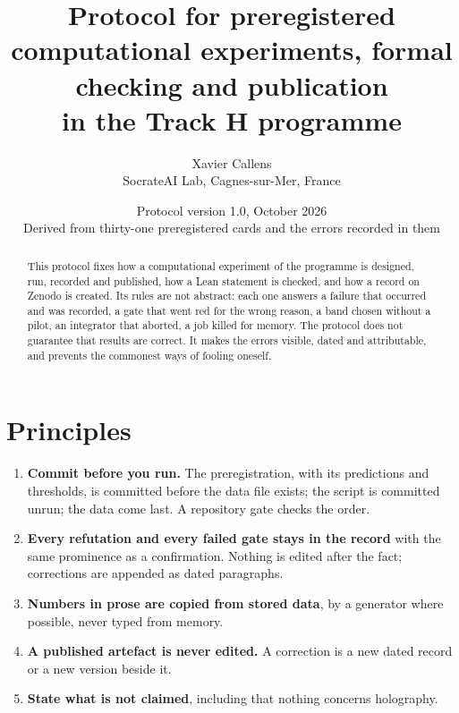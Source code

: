 \documentclass[11pt,a4paper]{article}
\title{Protocol for preregistered computational experiments, formal checking and publication\\ in the Track H programme}
\author{Xavier Callens\\[2pt]
\small SocrateAI Lab, Cagnes-sur-Mer, France}
\date{Protocol version 1.0, October 2026\\ \small Derived from thirty-one preregistered cards and the errors recorded in them}
\begin{document}
\maketitle

\begin{abstract}\noindent
This protocol fixes how a computational experiment of the programme is designed, run, recorded and published, how a Lean statement is checked, and how a record on Zenodo is created. Its rules are not abstract: each one answers a failure that occurred and was recorded, a gate that went red for the wrong reason, a band chosen without a pilot, an integrator that aborted, a job killed for memory.
The protocol does not guarantee that results are correct. It makes the errors visible, dated and attributable, and prevents the commonest ways of fooling oneself.
\end{abstract}

\section{Principles}
\begin{enumerate}
\item \textbf{Commit before you run.} The preregistration, with its predictions and thresholds, is committed before the data file exists; the script is committed unrun; the data come last. A repository gate checks the order.
\item \textbf{Every refutation and every failed gate stays in the record} with the same prominence as a confirmation. Nothing is edited after the fact; corrections are appended as dated paragraphs.
\item \textbf{Numbers in prose are copied from stored data}, by a generator where possible, never typed from memory.
\item \textbf{A published artefact is never edited.} A correction is a new dated record or a new version beside it.
\item \textbf{State what is not claimed}, including that nothing concerns holography.
\end{enumerate}
\end{document}
